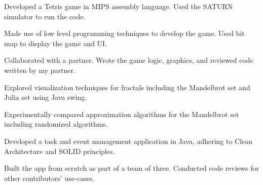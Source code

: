 \documentclass[letterpaper,10pt]{article}
\begin{document}
    \begin{resume_list}
        \item Developed a Tetris game in MIPS assembly language. Used the SATURN simulator to run the code.
        \item Made use of low level programming techniques to develop the game. Used bit map to display the game and UI.
        \item Collaborated with a partner. Wrote the game logic, graphics, and reviewed code written by my partner.
    \end{resume_list}

    \begin{resume_list}
        \item Explored visualization techniques for fractals including the Mandelbrot set and Julia set using Java swing.
        \item Experimentally compared approximation algorithms for the Mandelbrot set including randomized algorithms.
    \end{resume_list}
    
    \begin{resume_list}
        \item Developed a task and event management application in Java, adhering to Clean Architecture and SOLID principles.
        \item Built the app from scratch as part of a team of three. Conducted code reviews for other contributors' use-cases.
    \end{resume_list}

    
\end{document}
